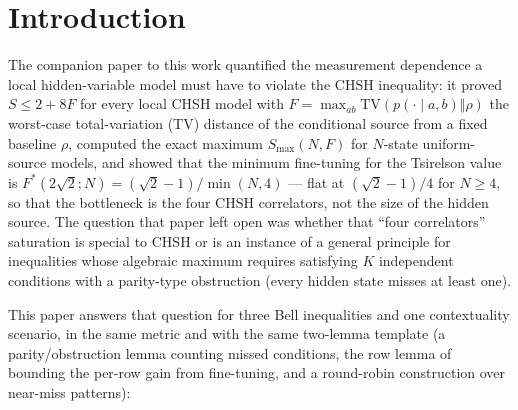 \documentclass[aps,pra,reprint,superscriptaddress,floatfix]{revtex4-2}
\newcommand{\TV}{\mathrm{TV}}
\begin{document}
\section{Introduction}
\label{sec:intro}

The companion paper to this work
\cite{mainpaper2026} quantified the measurement dependence a local
hidden-variable model must have to violate the {CHSH} inequality: it proved
$S\le 2+8F$ for every local {CHSH} model with
$F=\max_{ab}\TV(p(\cdot\mid a,b)\Vert\rho)$ the worst-case
total-variation (TV) distance of the conditional source from a fixed
baseline $\rho$, computed the exact maximum $S_{\max}(N,F)$ for $N$-state
uniform-source models, and showed that the minimum fine-tuning for the
Tsirelson value is $F^{*}(2\sqrt{2};N)=(\sqrt{2}-1)/\min(N,4)$ --- flat at
$(\sqrt{2}-1)/4$ for $N\ge 4$, so that the bottleneck is the four {CHSH}
correlators, not the size of the hidden source. The question that paper
left open was whether that ``four correlators'' saturation is special to
{CHSH} or is an instance of a general principle for inequalities whose
algebraic maximum requires satisfying $K$ independent conditions with a
parity-type obstruction (every hidden state misses at least one).

This paper answers that question for three {Bell} inequalities and one
contextuality scenario, in the same metric and with the same two-lemma
template (a parity/obstruction lemma counting missed conditions, the row
lemma of \cite{mainpaper2026} bounding the per-row gain from fine-tuning,
and a round-robin construction over near-miss patterns):
\end{document}
